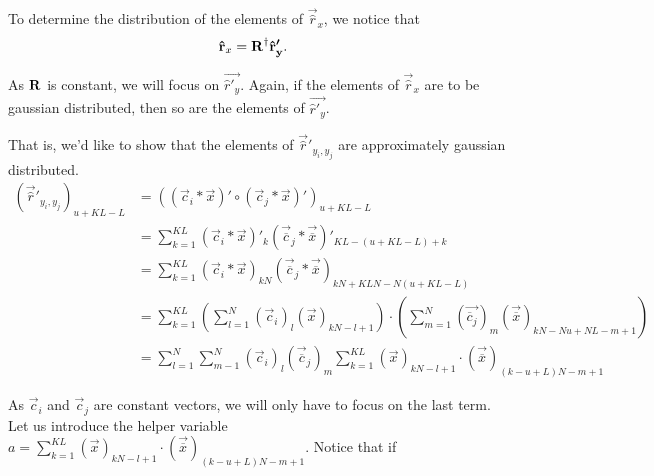 \documentclass[a4paper, openany, oneside]{memoir}
\begin{document}
To determine the distribution of the elements of $\vec{\hat{r}}_x$, we notice that 
\begin{align*}
\boldsymbol{\mathbf{\hat{r}}}_x &= \boldsymbol{\mathbf{R}}^{\dagger}\boldsymbol{\mathbf{\hat{r}'_y}}.
\end{align*}

As $\boldsymbol{\mathbf{R}}$ is constant, we will focus on $\vec{\hat{r}'_y}$. Again, if the elements of $\vec{\hat{r}}_x$ are to be gaussian distributed, then so are the elements of $\vec{\hat{r}'_y}$.

That is, we'd like to show that the elements of $\vec{\hat{r}}'_{y_i,y_j}$ are approximately gaussian distributed.
\begin{align*}
(\vec{\hat{r}}'_{y_i,y_j})_{u+KL-L} &= \left(\left(\vec{c}_i\ast\vec{x}\right)' \circ \left(\vec{c}_j\ast\vec{x}\right)' \right)_{u+KL-L} \\
&= \sum_{k=1}^{KL} \left(\vec{c}_i\ast\vec{x}\right)'_k \left(\vec{\overline{c}}_j\ast\vec{\overline{x}}\right)'_{KL-(u+KL-L)+k} \\
&= \sum_{k=1}^{KL} \left(\vec{c}_i\ast\vec{x}\right)_{kN} \left(\vec{\overline{c}}_j\ast\vec{\overline{x}}\right)_{kN+KLN-N(u+KL-L)}\\
&=  \sum_{k=1}^{KL} \left(\sum_{l=1}^N \left(\vec{c}_i\right)_l\left(\vec{x}\right)_{kN-l+1}\right) \cdot \left(\sum_{m=1}^{N} \left(\vec{\overline{c}_j}\right)_m\left(\vec{\overline{x}}\right)_{kN - Nu + NL - m+1}\right)\\
&= \sum_{l=1}^N\sum_{m-1}^N \left(\vec{c}_i\right)_l \left(\vec{\overline{c}}_j\right)_m \sum_{k=1}^{KL} (\vec{x})_{kN-l+1} \cdot (\vec{\overline{x}})_{(k-u+L)N - m+1}
\end{align*}

As $\vec{c}_i$ and $\vec{c}_j$ are constant vectors, we will only have to focus on the last term. Let us introduce the helper variable $a =  \sum_{k=1}^{KL} (\vec{x})_{kN-l+1} \cdot (\vec{\overline{x}})_{(k-u+L)N - m+1}$. Notice that if
\end{document}
